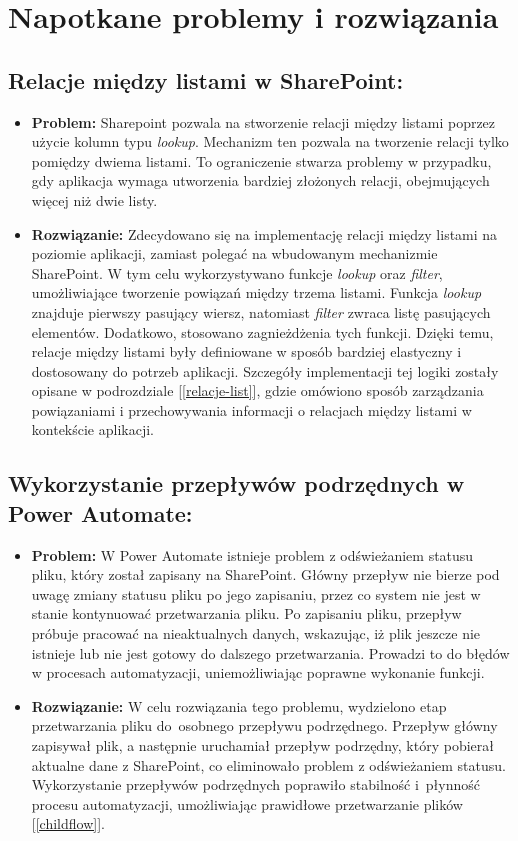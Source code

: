 \chapter{Napotkane problemy i rozwiązania}


\section*{Relacje między listami w SharePoint:}
\begin{itemize}
      \item \textbf{Problem:}
            Sharepoint pozwala na stworzenie relacji między listami poprzez użycie kolumn typu \emph{lookup}. Mechanizm ten pozwala na tworzenie relacji tylko pomiędzy dwiema listami. To ograniczenie stwarza problemy w przypadku, gdy aplikacja wymaga utworzenia bardziej złożonych relacji, obejmujących więcej niż dwie listy.
      \item \textbf{Rozwiązanie:} Zdecydowano się na implementację relacji między listami na poziomie aplikacji, zamiast polegać na wbudowanym mechanizmie SharePoint. W tym celu wykorzystywano funkcje \emph{lookup} oraz \emph{filter}, umożliwiające tworzenie powiązań między trzema listami. Funkcja \emph{lookup} znajduje pierwszy pasujący wiersz, natomiast \emph{filter} zwraca listę pasujących elementów. Dodatkowo, stosowano zagnieżdżenia tych funkcji. Dzięki temu, relacje między listami były definiowane w sposób bardziej elastyczny i dostosowany do potrzeb aplikacji. Szczegóły implementacji tej logiki zostały opisane w podrozdziale [\ref{relacje-list}], gdzie omówiono sposób zarządzania powiązaniami i przechowywania informacji o relacjach między listami w kontekście aplikacji.
\end{itemize}

\section*{Wykorzystanie przepływów podrzędnych w Power Automate:}
\begin{itemize}
      \item \textbf{Problem:} W Power Automate istnieje problem z odświeżaniem statusu pliku, który został zapisany na SharePoint. Główny przepływ nie bierze pod uwagę zmiany statusu pliku po jego zapisaniu, przez co system nie jest w stanie kontynuować przetwarzania pliku. Po zapisaniu pliku, przepływ próbuje pracować na nieaktualnych danych, wskazując, iż plik jeszcze nie istnieje lub nie jest gotowy do dalszego przetwarzania. Prowadzi to do błędów w procesach automatyzacji, uniemożliwiając poprawne wykonanie funkcji.
      \item \textbf{Rozwiązanie:} W celu rozwiązania tego problemu, wydzielono etap przetwarzania pliku do~osobnego przepływu podrzędnego. Przepływ główny zapisywał plik, a następnie uruchamiał przepływ podrzędny, który pobierał aktualne dane z SharePoint, co eliminowało problem z odświeżaniem statusu. Wykorzystanie przepływów podrzędnych poprawiło stabilność i~płynność procesu automatyzacji, umożliwiając prawidłowe przetwarzanie plików [\ref{childflow}].
\end{itemize}



